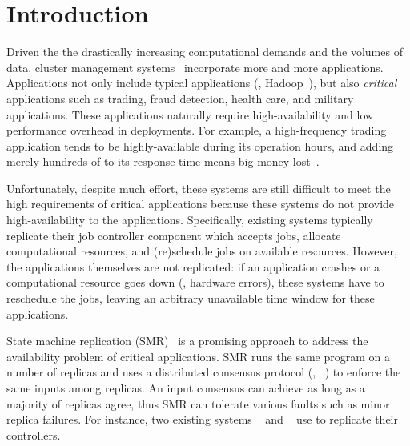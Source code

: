 \section{Introduction} \label{sec:intro}

Driven the the drastically increasing computational demands and the volumes of 
data, cluster 
management systems~\cite{borg:eurosys15,mesos:nsdi11,tupperware,yarn:socc13,
autopilot:sosp07,quincy:sosp09,apollo:osdi14,fuxi:vldb14} 
incorporate more and more applications. Applications not only include typical 
applications (\eg, Hadoop~\cite{hadoop}), but also \emph{critical} 
applications such as trading, fraud detection, health care, and military 
applications. These applications naturally require high-availability and low 
performance overhead in deployments. For example, a high-frequency trading 
application tends to be highly-available during its operation hours, and adding 
merely hundreds of \us to its response time means big money 
lost~\cite{nosql:finance}.


Unfortunately, despite much effort, these systems are still difficult to meet 
the high requirements of critical applications because these systems do not 
provide high-availability to the applications. Specifically, existing systems 
typically replicate their job controller component which accepts jobs, allocate 
computational resources, and (re)schedule jobs on available resources. However, 
the applications themselves are not replicated: if an application crashes or a 
computational resource goes down (\eg, hardware errors), these systems have to 
reschedule the jobs, leaving an arbitrary unavailable time window for these 
applications.

State machine replication (SMR)~\cite{paxos} is a promising approach 
to address the availability problem of critical applications. SMR runs the 
same program on a number of replicas and uses a distributed consensus protocol 
(\eg, 
\paxos~\cite{paxos:practical,paxos,paxos:simple,paxos:complex,epaxos:sosp13}) 
to enforce the same inputs among 
replicas. An input consensus can achieve as long as a majority of replicas 
agree, thus SMR can tolerate various faults such as minor replica failures. For 
instance, two existing systems \borg~\cite{borg:eurosys15} and 
\mesos~\cite{mesos:nsdi11} use \paxos to replicate their controllers.

